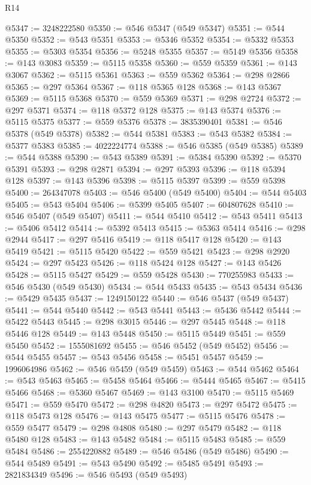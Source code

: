 \begin{lexlean}{R14}
\begin{coremodule}
@5347 := 3248222580
@5350 := @546 @5347 (@549 @5347)
@5351 := @544 @5350
@5352 := @543 @5351
@5353 := @5346 @5352
@5354 := @5332 @5353
@5355 := @5303 @5354
@5356 := @5248 @5355
@5357 := @5149 @5356
@5358 := @143 @3083
@5359 := @5115 @5358
@5360 := @559 @5359
@5361 := @143 @3067
@5362 := @5115 @5361
@5363 := @559 @5362
@5364 := @298 @2866
@5365 := @297 @5364
@5367 := @118 @5365 @128
@5368 := @143 @5367
@5369 := @5115 @5368
@5370 := @559 @5369
@5371 := @298 @2724
@5372 := @297 @5371
@5374 := @118 @5372 @128
@5375 := @143 @5374
@5376 := @5115 @5375
@5377 := @559 @5376
@5378 := 3835390401
@5381 := @546 @5378 (@549 @5378)
@5382 := @544 @5381
@5383 := @543 @5382
@5384 := @5377 @5383
@5385 := 4022224774
@5388 := @546 @5385 (@549 @5385)
@5389 := @544 @5388
@5390 := @543 @5389
@5391 := @5384 @5390
@5392 := @5370 @5391
@5393 := @298 @2871
@5394 := @297 @5393
@5396 := @118 @5394 @128
@5397 := @143 @5396
@5398 := @5115 @5397
@5399 := @559 @5398
@5400 := 264347078
@5403 := @546 @5400 (@549 @5400)
@5404 := @544 @5403
@5405 := @543 @5404
@5406 := @5399 @5405
@5407 := 604807628
@5410 := @546 @5407 (@549 @5407)
@5411 := @544 @5410
@5412 := @543 @5411
@5413 := @5406 @5412
@5414 := @5392 @5413
@5415 := @5363 @5414
@5416 := @298 @2944
@5417 := @297 @5416
@5419 := @118 @5417 @128
@5420 := @143 @5419
@5421 := @5115 @5420
@5422 := @559 @5421
@5423 := @298 @2920
@5424 := @297 @5423
@5426 := @118 @5424 @128
@5427 := @143 @5426
@5428 := @5115 @5427
@5429 := @559 @5428
@5430 := 770255983
@5433 := @546 @5430 (@549 @5430)
@5434 := @544 @5433
@5435 := @543 @5434
@5436 := @5429 @5435
@5437 := 1249150122
@5440 := @546 @5437 (@549 @5437)
@5441 := @544 @5440
@5442 := @543 @5441
@5443 := @5436 @5442
@5444 := @5422 @5443
@5445 := @298 @3015
@5446 := @297 @5445
@5448 := @118 @5446 @128
@5449 := @143 @5448
@5450 := @5115 @5449
@5451 := @559 @5450
@5452 := 1555081692
@5455 := @546 @5452 (@549 @5452)
@5456 := @544 @5455
@5457 := @543 @5456
@5458 := @5451 @5457
@5459 := 1996064986
@5462 := @546 @5459 (@549 @5459)
@5463 := @544 @5462
@5464 := @543 @5463
@5465 := @5458 @5464
@5466 := @5444 @5465
@5467 := @5415 @5466
@5468 := @5360 @5467
@5469 := @143 @3100
@5470 := @5115 @5469
@5471 := @559 @5470
@5472 := @298 @4820
@5473 := @297 @5472
@5475 := @118 @5473 @128
@5476 := @143 @5475
@5477 := @5115 @5476
@5478 := @559 @5477
@5479 := @298 @4808
@5480 := @297 @5479
@5482 := @118 @5480 @128
@5483 := @143 @5482
@5484 := @5115 @5483
@5485 := @559 @5484
@5486 := 2554220882
@5489 := @546 @5486 (@549 @5486)
@5490 := @544 @5489
@5491 := @543 @5490
@5492 := @5485 @5491
@5493 := 2821834349
@5496 := @546 @5493 (@549 @5493)

\end{coremodule}
\end{lexlean}
